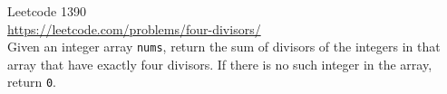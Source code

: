   Leetcode 1390 \\
  \url{https://leetcode.com/problems/four-divisors/} \\
  Given an integer array \verb!nums!,
  return the sum of divisors of the integers in that array that have exactly
  four divisors.
  If there is no such integer in the array, return \verb!0!.
